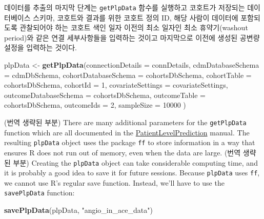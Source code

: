 \documentclass[11pt]{book}
\newenvironment{Shaded}{\begin{snugshade}}{\end{snugshade}}
\newcommand{\KeywordTok}[1]{\textcolor[rgb]{0.13,0.29,0.53}{\textbf{#1}}}
\newcommand{\DataTypeTok}[1]{\textcolor[rgb]{0.13,0.29,0.53}{#1}}
\newcommand{\DecValTok}[1]{\textcolor[rgb]{0.00,0.00,0.81}{#1}}
\newcommand{\StringTok}[1]{\textcolor[rgb]{0.31,0.60,0.02}{#1}}
\newcommand{\NormalTok}[1]{#1}
\theoremstyle{definition}
\theoremstyle{definition}
\theoremstyle{definition}
\theoremstyle{remark}
\begin{document}
데이터를 추출의 마지막 단계는 \texttt{getPlpData} 함수를 실행하고
코호트가 저장되는 데이터베이스 스키마, 코호트와 결과를 위한 코호트 정의
ID, 해당 사람이 데이터에 포함되도록 관찰되어야 하는 코호트 색인 일자
이전의 최소 일자인 최소 휴약기(washout period)와 같은 연결 세부사항들을
입력하는 것이고 마지막으로 이전에 생성된 공변량 설정을 입력하는 것이다.

\begin{Shaded}
\begin{Highlighting}[]
\NormalTok{plpData <-}\StringTok{ }\KeywordTok{getPlpData}\NormalTok{(}\DataTypeTok{connectionDetails =}\NormalTok{ connDetails,}
                      \DataTypeTok{cdmDatabaseSchema =}\NormalTok{ cdmDbSchema,}
                      \DataTypeTok{cohortDatabaseSchema =}\NormalTok{ cohortsDbSchema,}
                      \DataTypeTok{cohortTable =}\NormalTok{ cohortsDbSchema,}
                      \DataTypeTok{cohortId =} \DecValTok{1}\NormalTok{,}
                      \DataTypeTok{covariateSettings =}\NormalTok{ covariateSettings,}
                      \DataTypeTok{outcomeDatabaseSchema =}\NormalTok{ cohortsDbSchema,}
                      \DataTypeTok{outcomeTable =}\NormalTok{ cohortsDbSchema,}
                      \DataTypeTok{outcomeIds =} \DecValTok{2}\NormalTok{,}
                      \DataTypeTok{sampleSize =} \DecValTok{10000}
\NormalTok{)}
\end{Highlighting}
\end{Shaded}

(번역 생략된 부분) There are many additional parameters for the
\texttt{getPlpData} function which are all documented in the
\href{https://ohdsi.github.io/PatientLevelPrediction/}{PatientLevelPrediction}
manual. The resulting \texttt{plpData} object uses the package
\texttt{ff} to store information in a way that ensures R does not run
out of memory, even when the data are large. (번역 생략된 부분) Creating
the \texttt{plpData} object can take considerable computing time, and it
is probably a good idea to save it for future sessions. Because
\texttt{plpData} uses \texttt{ff}, we cannot use R's regular save
function. Instead, we'll have to use the \texttt{savePlpData} function:

\begin{Shaded}
\begin{Highlighting}[]
\KeywordTok{savePlpData}\NormalTok{(plpData, }\StringTok{"angio_in_ace_data"}\NormalTok{)}
\end{Highlighting}
\end{Shaded}
\end{document}
